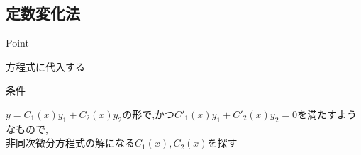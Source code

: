 \documentclass[a4paper]{jsarticle}
\begin{document}
\subsection{定数変化法}
\begin{itembox}[l]{Point}
    \begin{center}
        方程式に代入する
    \end{center}
\end{itembox}
\begin{itembox}[l]{条件}
    \begin{center}
        $y=C_1\left(x\right)y_1+C_2\left(x\right)y_2$の形で,かつ$C'_1\left(x\right)y_1+C'_2\left(x\right)y_2=0$を満たすようなもので,\\
        非同次微分方程式の解になる$C_1\left(x\right),C_2\left(x\right)$を探す
    \end{center}
\end{itembox}
\end{document}
